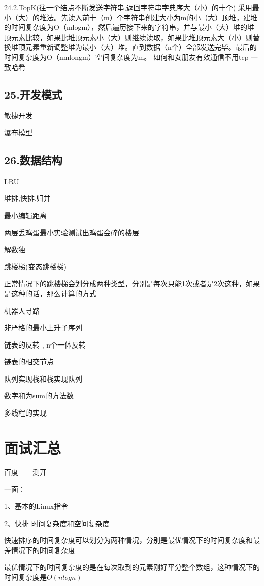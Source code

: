 \documentclass[UTF8]{ctexart}
\begin{document}
24.2.TopK(往一个结点不断发送字符串,返回字符串字典序大（小）的十个)
采用最小（大）的堆法。先读入前十（m）个字符串创建大小为m的小（大）顶堆，建堆的时间复杂度为O（mlogm），然后遍历接下来的字符串，并与最小（大）堆的堆顶元素比较，如果比堆顶元素小（大）则继续读取，如果比堆顶元素大（小）则替换堆顶元素重新调整堆为最小（大）堆。直到数据（n个）全部发送完毕。最后的时间复杂度为O（nmlongm）空间复杂度为m。
如何和女朋友有效通信不用tcp
一致哈希

\subsection{25.开发模式}

敏捷开发

瀑布模型

\subsection{26.数据结构}

LRU

堆排,快排,归并

最小编辑距离

两层丢鸡蛋最小实验测试出鸡蛋会碎的楼层

解数独

跳楼梯(变态跳楼梯)

正常情况下的跳楼梯会划分成两种类型，分别是每次只能1次或者是2次这种，如果是这种的话，那么计算的方式 

机器人寻路

非严格的最小上升子序列

链表的反转 , n个一体反转

链表的相交节点

队列实现栈和栈实现队列

数字和为sum的方法数

多线程的实现

\section{面试汇总}
百度——测开

一面：

1、基本的Linux指令

2、快排 时间复杂度和空间复杂度

快速排序的时间复杂度可以划分为两种情况，分别是最优情况下的时间复杂度和最差情况下的时间复杂度

最优情况下的时间复杂度的是在每次取到的元素刚好平分整个数组，这种情况下的时间复杂度是$O(nlogn)$
\end{document}
